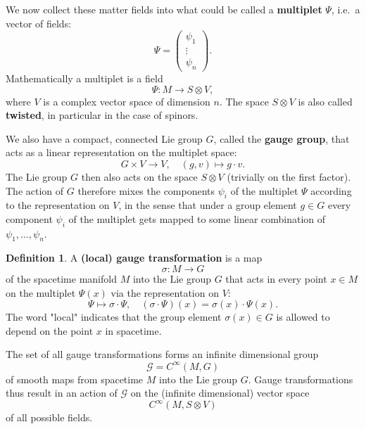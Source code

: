 \documentclass[12pt]{amsart}
\theoremstyle{definition}
\newtheorem{defn}[thm]{Definition}
\theoremstyle{remark}
\numberwithin{equation}{section}
\begin{document}
We now collect these matter fields into what could be called a  {\bf multiplet} $\Psi$, i.e.~a vector of fields:
\begin{equation*}
\Psi=\left(\begin{array}{c} \psi_1 \\ \vdots \\ \psi_n\end{array}\right).
\end{equation*} 
Mathematically a multiplet is a field
\begin{equation*}
\Psi\colon M\longrightarrow S\otimes V,
\end{equation*}
where $V$ is a complex vector space of dimension $n$. The space $S\otimes V$ is also called {\bf twisted}, in particular in the case of spinors.

We also have a compact, connected Lie group $G$, called the {\bf gauge group}, that acts as a linear representation on the multiplet space:
\begin{equation*}
G\times V\longrightarrow V,\quad(g,v)\longmapsto g\cdot v.
\end{equation*} 
The Lie group $G$ then also acts on the space $S\otimes V$ (trivially on the first factor). The action of $G$ therefore mixes the components $\psi_i$ of the multiplet $\Psi$ according to the representation on $V$, in the sense that under a group element $g\in G$ every component $\psi_i$ of the multiplet gets mapped to some linear combination of $\psi_1,\ldots,\psi_n$. 
\begin{defn}
A {\bf (local) gauge transformation} is a map 
\begin{equation*}
\sigma\colon M\longrightarrow G
\end{equation*} 
of the spacetime manifold $M$ into the Lie group $G$ that acts in every point $x\in M$ on the multiplet $\Psi(x)$ via the representation on $V$: 
\begin{equation*}
\Psi\longmapsto \sigma\cdot\Psi,\quad (\sigma\cdot\Psi)(x)=\sigma(x)\cdot\Psi(x).
\end{equation*}
The word "{}local"{} indicates that the group element $\sigma(x)\in G$ is allowed to depend on the point $x$ in spacetime.
\end{defn}
The set of all gauge transformations forms an infinite dimensional group 
\begin{equation*}
\mathcal{G}=C^\infty(M,G)
\end{equation*}
of smooth maps from spacetime $M$ into the Lie group $G$. Gauge transformations thus result in an action of $\mathcal{G}$ on the (infinite dimensional) vector space
\begin{equation*}
C^\infty(M,S\otimes V)
\end{equation*}
of all possible fields.
\end{document}
